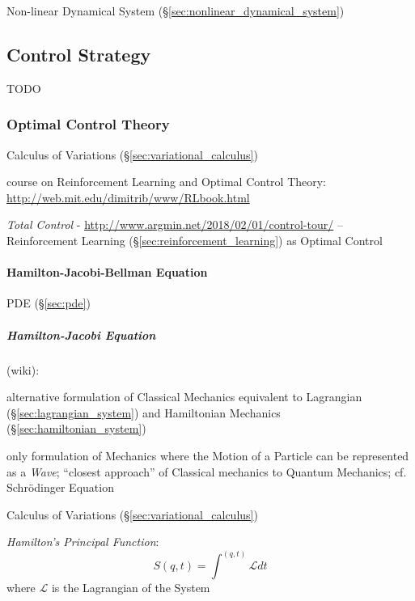 Non-linear Dynamical System (\S\ref{sec:nonlinear_dynamical_system})



\subsection{Control Strategy}\label{sec:control_strategy}

TODO



\subsubsection{Optimal Control Theory}\label{sec:optimal_control}

\fist Calculus of Variations (\S\ref{sec:variational_calculus})

course on Reinforcement Learning and Optimal Control Theory:
\url{http://web.mit.edu/dimitrib/www/RLbook.html}

\emph{Total Control} - \url{http://www.argmin.net/2018/02/01/control-tour/} --
Reinforcement Learning (\S\ref{sec:reinforcement_learning}) as Optimal Control



\paragraph{Hamilton-Jacobi-Bellman Equation}
\label{sec:hamilton_jacobi_bellman}\hfill

PDE (\S\ref{sec:pde})



\subparagraph{Hamilton-Jacobi Equation}\label{sec:hamilton_jacobi}\hfill

(wiki):

alternative formulation of Classical Mechanics equivalent to Lagrangian
(\S\ref{sec:lagrangian_system}) and Hamiltonian Mechanics
(\S\ref{sec:hamiltonian_system})

only formulation of Mechanics where the Motion of a Particle can be represented
as a \emph{Wave}; ``closest approach'' of Classical mechanics to Quantum
Mechanics; cf. Schr\"odinger Equation

\fist Calculus of Variations (\S\ref{sec:variational_calculus})

\emph{Hamilton's Principal Function}:
\[
  S(q,t) = \int^{(q,t)} \mathcal{L} dt
\]
where $\mathcal{L}$ is the Lagrangian of the System

